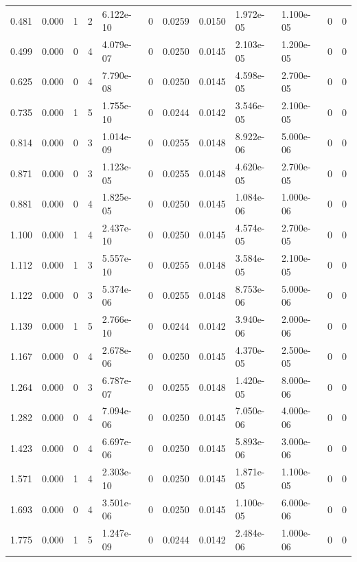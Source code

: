 \documentclass[preview]{standalone}
\begin{document}
{{\begin{tabular}{L{1.2cm}C{1.2cm} C{0.3cm}C{0.5cm} C{1.4cm}C{1.4cm} C{1.4cm}C{1.4cm} C{1.6cm}C{1.6cm} C{1.6cm}C{1.6cm}}
  0.481  &  0.000  & 1     &  2 &  6.122e-10  & 0  &  0.0259&   0.0150& 1.972e-05 & 1.100e-05   &  0 & 0  \\ 
  0.499  &  0.000  & 0     &  4 &  4.079e-07  & 0  &  0.0250&   0.0145& 2.103e-05 & 1.200e-05   &  0 & 0  \\ 
  0.625  &  0.000  & 0     &  4 &  7.790e-08  & 0  &  0.0250&   0.0145& 4.598e-05 & 2.700e-05   &  0 & 0  \\ 
  0.735  &  0.000  & 1     &  5 &  1.755e-10  & 0  &  0.0244&   0.0142& 3.546e-05 & 2.100e-05   &  0 & 0  \\ 
  0.814  &  0.000  & 0     &  3 &  1.014e-09  & 0  &  0.0255&   0.0148& 8.922e-06 & 5.000e-06   &  0 & 0  \\ 
  0.871  &  0.000  & 0     &  3 &  1.123e-05  & 0  &  0.0255&   0.0148& 4.620e-05 & 2.700e-05   &  0 & 0  \\ 
  0.881  &  0.000  & 0     &  4 &  1.825e-05  & 0  &  0.0250&   0.0145& 1.084e-06 & 1.000e-06   &  0 & 0  \\ 
  1.100  &  0.000  & 1     &  4 &  2.437e-10  & 0  &  0.0250&   0.0145& 4.574e-05 & 2.700e-05   &  0 & 0  \\ 
  1.112  &  0.000  & 1     &  3 &  5.557e-10  & 0  &  0.0255&   0.0148& 3.584e-05 & 2.100e-05   &  0 & 0  \\ 
  1.122  &  0.000  & 0     &  3 &  5.374e-06  & 0  &  0.0255&   0.0148& 8.753e-06 & 5.000e-06   &  0 & 0  \\ 
  1.139  &  0.000  & 1     &  5 &  2.766e-10  & 0  &  0.0244&   0.0142& 3.940e-06 & 2.000e-06   &  0 & 0  \\ 
  1.167  &  0.000  & 0     &  4 &  2.678e-06  & 0  &  0.0250&   0.0145& 4.370e-05 & 2.500e-05   &  0 & 0  \\ 
  1.264  &  0.000  & 0     &  3 &  6.787e-07  & 0  &  0.0255&   0.0148& 1.420e-05 & 8.000e-06   &  0 & 0  \\ 
  1.282  &  0.000  & 0     &  4 &  7.094e-06  & 0  &  0.0250&   0.0145& 7.050e-06 & 4.000e-06   &  0 & 0  \\ 
  1.423  &  0.000  & 0     &  4 &  6.697e-06  & 0  &  0.0250&   0.0145& 5.893e-06 & 3.000e-06   &  0 & 0  \\ 
  1.571  &  0.000  & 1     &  4 &  2.303e-10  & 0  &  0.0250&   0.0145& 1.871e-05 & 1.100e-05   &  0 & 0  \\ 
  1.693  &  0.000  & 0     &  4 &  3.501e-06  & 0  &  0.0250&   0.0145& 1.100e-05 & 6.000e-06   &  0 & 0  \\ 
  1.775  &  0.000  & 1     &  5 &  1.247e-09  & 0  &  0.0244&   0.0142& 2.484e-06 & 1.000e-06   &  0 & 0  \\ 

\end{tabular}}}
\end{document}
